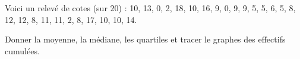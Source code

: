 
\begin{exercice}\label{exoSeconde-0027}

    Voici un relevé de cotes (sur \( 20\)) : 10, 13, 0, 2, 18, 10, 16, 9, 0, 9, 9, 5, 5, 6, 5, 8, 12, 12, 8, 11, 11, 2, 8, 17, 10, 10, 14.

    Donner la moyenne, la médiane, les quartiles et tracer le graphes des effectifs cumulées.

\end{exercice}
